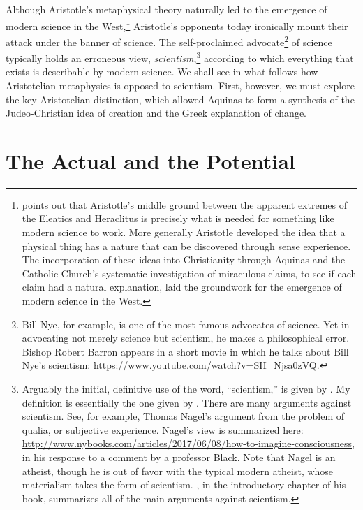 \documentclass[twocolumn]{article}
\begin{document}
Although Aristotle's metaphysical theory naturally led to the emergence of
modern science in the West,\footnote{%
   \citet[Chapter 1]{f2014} points out that Aristotle's middle ground between
   the apparent extremes of the Eleatics and Heraclitus is precisely what is
   needed for something like modern science to work.  More generally Aristotle
   developed the idea that a physical thing has a nature that can be discovered
   through sense experience.  The incorporation of these ideas into
   Christianity through Aquinas and the Catholic Church's systematic
   investigation of miraculous claims, to see if each claim had a natural
   explanation, laid the groundwork for the emergence of modern science in the
   West.
}
Aristotle's opponents today ironically mount their attack under the banner of
science.  The self-proclaimed advocate\footnote{%
   Bill Nye, for example, is one of the most famous advocates of science.  Yet
   in advocating not merely science but scientism, he makes a philosophical
   error.  Bishop Robert Barron appears in a short movie in which he talks
   about Bill Nye's scientism:
   \url{https://www.youtube.com/watch?v=SH_Njsa0zVQ}.%
}
of science typically holds an erroneous view, \emph{scientism},\footnote{%
   Arguably the initial, definitive use of the word, ``scientism,'' is given by
   \cite{s1991}.  My definition is essentially the one given by \cite{h2011}.
   There are many arguments against scientism.  See, for example, Thomas
   Nagel's argument from the problem of qualia, or subjective experience.
   Nagel's view is summarized here:
   \url{http://www.nybooks.com/articles/2017/06/08/how-to-imagine-consciousness},
   in his response to a comment by a professor Black.  Note that Nagel is an
   atheist, though he is out of favor with the typical modern atheist, whose
   materialism takes the form of scientism.  \cite{f2014}, in the introductory
   chapter of his book, summarizes all of the main arguments against
   scientism.%
}
according to which everything that exists is describable by modern science.  We
shall see in what follows how Aristotelian metaphysics is opposed to scientism.
First, however, we must explore the key Aristotelian distinction, which allowed
Aquinas to form a synthesis of the Judeo-Christian idea of creation and the
Greek explanation of change.

\section{The Actual and the Potential}
\end{document}
